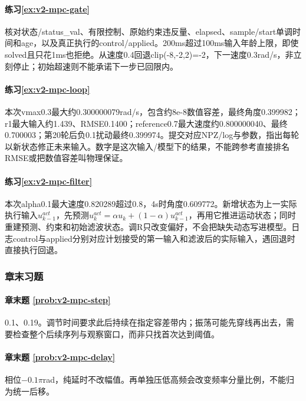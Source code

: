 \paragraph*{练习\ref{ex:v2-mpc-gate}}
\begin{solution}
核对状态/status\_val、有限控制、原始约束违反量、elapsed、sample/start单调时间和age，以及真正执行的control/applied。200ms超过100ms输入年龄上限，即使solved且只花1ms也拒绝。从速度0.4回退clip(-8,-2,2)=-2，下一速度0.3rad/s，非立刻停止；初始超速则不能承诺下一步已回限内。
\end{solution}
\paragraph*{练习\ref{ex:v2-mpc-loop}}
\begin{solution}
本次vmax0.3最大约0.300000079rad/s，包含约8e-8数值容差，最终角度0.399982；r1最大输入约1.439、RMSE0.1400；reference0.7最大速度约0.800000040、最终0.700003；第20轮后负0.1扰动最终0.399974。提交对应NPZ/log与参数，指出每轮以新状态修正未来输入。数字是这次输入/模型下的结果，不能跨参考直接排名RMSE或把数值容差叫物理保证。
\end{solution}
\paragraph*{练习\ref{ex:v2-mpc-filter}}
\begin{solution}
本次alpha0.1最大速度0.820289超过0.8，4s时角度0.609772。新增状态为上一实际执行输入$u^{act}_{k-1}$，先预测$u^{act}_k=\alpha u_k+(1-\alpha)u^{act}_{k-1}$，再用它推进运动状态；同时重建预测、约束和初始滤波状态。调R只改变偏好，不会把缺失动态写进模型。日志control与applied分别对应计划接受的第一输入和滤波后的实际输入，遇回退时直接执行回退。
\end{solution}

\subsubsection*{章末习题}
\paragraph*{章末题 \ref{prob:v2-mpc-step}}
\begin{solution}
0.1、0.19。调节时间要求此后持续在指定容差带内；振荡可能先穿线再出去，需要检查整个后续序列与观察窗口，而非只找首次达到阈值。
\end{solution}
\paragraph*{章末题 \ref{prob:v2-mpc-delay}}
\begin{solution}
相位$-0.1\pi$rad，纯延时不改幅值。再单独压低高频会改变频率分量比例，不能归为统一后移。
\end{solution}
